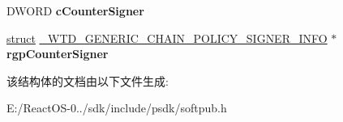\begin{DoxyCompactItemize}
D\+W\+O\+RD {\bfseries c\+Counter\+Signer}
\item 
\mbox{\label{struct___w_t_d___g_e_n_e_r_i_c___c_h_a_i_n___p_o_l_i_c_y___s_i_g_n_e_r___i_n_f_o_a979a18e7964231dc3b6072569a41c5e7}} 
\hyperlink{interfacestruct}{struct} \hyperlink{struct___w_t_d___g_e_n_e_r_i_c___c_h_a_i_n___p_o_l_i_c_y___s_i_g_n_e_r___i_n_f_o}{\+\_\+\+W\+T\+D\+\_\+\+G\+E\+N\+E\+R\+I\+C\+\_\+\+C\+H\+A\+I\+N\+\_\+\+P\+O\+L\+I\+C\+Y\+\_\+\+S\+I\+G\+N\+E\+R\+\_\+\+I\+N\+FO} $\ast$ {\bfseries rgp\+Counter\+Signer}
\end{DoxyCompactItemize}


该结构体的文档由以下文件生成\+:\begin{DoxyCompactItemize}
\item 
E\+:/\+React\+O\+S-\/0../sdk/include/psdk/softpub.\+h\end{DoxyCompactItemize}
